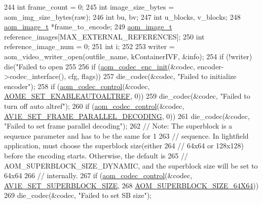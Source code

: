 \begin{DoxyCodeInclude}
{{{{244   \textcolor{keywordtype}{int} frame\_count = 0;
245   \textcolor{keywordtype}{int} image\_size\_bytes = aom\_img\_size\_bytes(raw);
246   \textcolor{keywordtype}{int} bu, bv;
247   \textcolor{keywordtype}{int} u\_blocks, v\_blocks;
248   \hyperlink{structaom__image}{aom\_image\_t} *frame\_to\_encode;
249   \hyperlink{structaom__image}{aom\_image\_t} reference\_images[MAX\_EXTERNAL\_REFERENCES];
250   \textcolor{keywordtype}{int} reference\_image\_num = 0;
251   \textcolor{keywordtype}{int} i;
252 
253   writer = aom\_video\_writer\_open(outfile\_name, kContainerIVF, &info);
254   \textcolor{keywordflow}{if} (!writer) die(\textcolor{stringliteral}{"Failed to open %
255 
256   \textcolor{keywordflow}{if} (\hyperlink{group__encoder_gaade68a7d33d30f97dc9a596aa5e065d8}{aom\_codec\_enc\_init}(&codec, encoder->codec\_interface(), cfg, flags))
257     die\_codec(&codec, \textcolor{stringliteral}{"Failed to initialize encoder"});
258   \textcolor{keywordflow}{if} (\hyperlink{group__codec_ga6da974f4eeaba1fa74106b28d0fe6ac5}{aom\_codec\_control}(&codec, \hyperlink{group__aom__encoder_ggae78dde67a6d78f332e9bdba0dde42db5ac8a24393f214823f5a6bd345afb840b6}{AOME\_SET\_ENABLEAUTOALTREF}, 0))
259     die\_codec(&codec, \textcolor{stringliteral}{"Failed to turn off auto altref"});
260   \textcolor{keywordflow}{if} (\hyperlink{group__codec_ga6da974f4eeaba1fa74106b28d0fe6ac5}{aom\_codec\_control}(&codec, 
      \hyperlink{group__aom__encoder_ggae78dde67a6d78f332e9bdba0dde42db5a465382b6bbca24467739c3c1b94e6483}{AV1E\_SET\_FRAME\_PARALLEL\_DECODING}, 0))
261     die\_codec(&codec, \textcolor{stringliteral}{"Failed to set frame parallel decoding"});
262   \textcolor{comment}{// Note: The superblock is a sequence parameter and has to be the same for 1}
263   \textcolor{comment}{// sequence. In lightfield application, must choose the superblock size(either}
264   \textcolor{comment}{// 64x64 or 128x128) before the encoding starts. Otherwise, the default is}
265   \textcolor{comment}{// AOM\_SUPERBLOCK\_SIZE\_DYNAMIC, and the superblock size will be set to 64x64}
266   \textcolor{comment}{// internally.}
267   \textcolor{keywordflow}{if} (\hyperlink{group__codec_ga6da974f4eeaba1fa74106b28d0fe6ac5}{aom\_codec\_control}(&codec, \hyperlink{group__aom__encoder_ggae78dde67a6d78f332e9bdba0dde42db5a8854a06c62269e866d6bac0f3a2e3dc2}{AV1E\_SET\_SUPERBLOCK\_SIZE},
268                         \hyperlink{group__codec_ggac34a24f7c6c0fef7518aed0da4425f61a5abd24080a18d4f7e33217d93a73e968}{AOM\_SUPERBLOCK\_SIZE\_64X64}))
269     die\_codec(&codec, \textcolor{stringliteral}{"Failed to set SB size"});
}}}}}
\end{DoxyCodeInclude}
